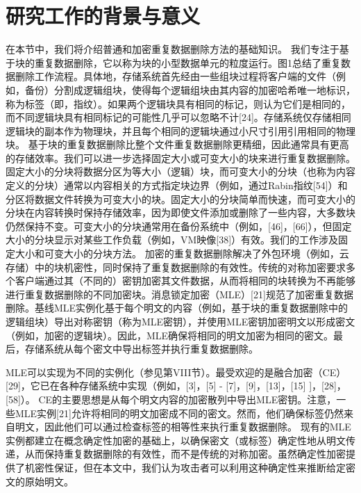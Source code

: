 \documentclass[bachelor]{thesis-uestc}
\begin{document}
\thesistableofcontents

\thesischapterexordium

\section{研究工作的背景与意义}

在本节中，我们将介绍普通和加密重复数据删除方法的基础知识。
我们专注于基于块的重复数据删除，它以称为块的小型数据单元的粒度运行。图1总结了重复数据删除工作流程。具体地，存储系统首先经由一些组块过程将客户端的文件（例如，备份）分割成逻辑组块，使得每个逻辑组块由其内容的加密哈希唯一地标识，称为标签（即，指纹）。如果两个逻辑块具有相同的标记，则认为它们是相同的，而不同逻辑块具有相同标记的可能性几乎可以忽略不计[24]。存储系统仅存储相同逻辑块的副本作为物理块，并且每个相同的逻辑块通过小尺寸引用引用相同的物理块。
基于块的重复数据删除比整个文件重复数据删除更精细，因此通常具有更高的存储效率。我们可以进一步选择固定大小或可变大小的块来进行重复数据删除。固定大小的分块将数据分区为等大小（逻辑）块，而可变大小的分块（也称为内容定义的分块）通常以内容相关的方式指定块边界（例如，通过Rabin指纹[54]）和分区将数据文件转换为可变大小的块。固定大小的分块简单而快速，而可变大小的分块在内容转换时保持存储效率，因为即使文件添加或删除了一些内容，大多数块仍然保持不变。可变大小的分块通常用在备份系统中（例如，[46]，[66]），但固定大小的分块显示对某些工作负载（例如，VM映像[38]）有效。我们的工作涉及固定大小和可变大小的分块方法。
加密的重复数据删除解决了外包环境（例如，云存储）中的块机密性，同时保持了重复数据删除的有效性。传统的对称加密要求多个客户端通过其（不同的）密钥加密其文件数据，从而将相同的块转换为不再能够进行重复数据删除的不同加密块。消息锁定加密（MLE）[21]规范了加密重复数据删除。基线MLE实例化基于每个明文的内容（例如，基于块的重复数据删除中的逻辑组块）导出对称密钥（称为MLE密钥），并使用MLE密钥加密明文以形成密文（例如，加密的逻辑块）。因此，MLE确保将相同的明文加密为相同的密文。最后，存储系统从每个密文中导出标签并执行重复数据删除。

MLE可以实现为不同的实例化（参见第VIII节）。最受欢迎的是融合加密（CE）[29]，它已在各种存储系统中实现（例如，[3]，[5]  -  [7]，[9]，[13]，[15] ]，[28]，[58]）。 CE的主要思想是从每个明文内容的加密散列中导出MLE密钥。注意，一些MLE实例[21]允许将相同的明文加密成不同的密文。然而，他们确保标签仍然来自明文，因此他们可以通过检查标签的相等性来执行重复数据删除。
现有的MLE实例都建立在概念确定性加密的基础上，以确保密文（或标签）确定性地从明文传递，从而保持重复数据删除的有效性，而不是传统的对称加密。虽然确定性加密提供了机密性保证，但在本文中，我们认为攻击者可以利用这种确定性来推断给定密文的原始明文。
\end{document}
